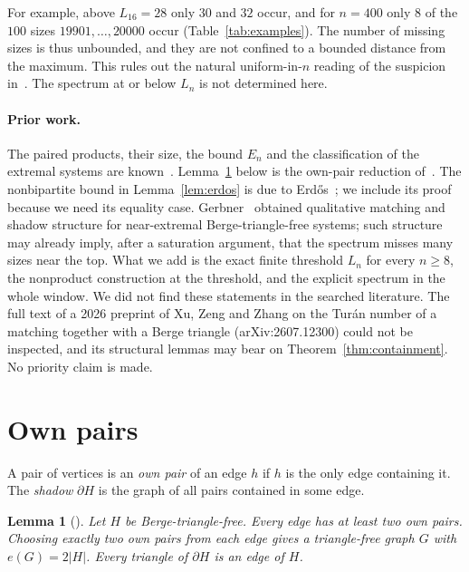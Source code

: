 \documentclass[11pt]{article}
\newtheorem{lemma}[theorem]{Lemma}
\theoremstyle{remark}
\newcommand{\sh}{\partial}
\begin{document}
For example, above $L_{16}=28$ only $30$ and $32$ occur, and for $n=400$
only $8$ of the $100$ sizes $19901,\dots,20000$ occur
(Table~\ref{tab:examples}). The number of missing sizes is thus unbounded,
and they are not confined to a bounded distance from the maximum. This
rules out the natural uniform-in-$n$ reading of the suspicion
in~\cite{BEHJR}. The spectrum at or below $L_n$ is not determined here.

\paragraph{Prior work.} The paired products, their size, the bound $E_n$
and the classification of the extremal systems are
known~\cite{Gyori,FFGHS}. Lemma~\ref{lem:own} below is the own-pair
reduction of~\cite[Observation~2]{FFGHS}. The nonbipartite bound in
Lemma~\ref{lem:erdos} is due to Erd\H{o}s~\cite[Lemma~1]{Erdos}; we include
its proof because we need its equality case. Gerbner~\cite{Gerbner}
obtained qualitative matching and shadow structure for near-extremal
Berge-triangle-free systems; such structure may already imply,
after a saturation argument, that the spectrum misses many sizes near the
top. What we add is the exact finite threshold $L_n$ for every $n\ge8$,
the nonproduct construction at the threshold, and the explicit spectrum in
the whole window. We did not find these statements in the searched
literature. The full text of a 2026 preprint of Xu, Zeng and Zhang on the
Tur\'an number of a matching together with a Berge triangle
(arXiv:2607.12300) could not be inspected, and its structural lemmas may
bear on Theorem~\ref{thm:containment}. No priority claim is made.

\section{Own pairs}

A pair of vertices is an \emph{own pair} of an edge $h$ if $h$ is the only
edge containing it. The \emph{shadow} $\sh H$ is the graph of all pairs
contained in some edge.

\begin{lemma}[{\cite[Observation~2]{FFGHS}}]\label{lem:own}
Let $H$ be Berge-triangle-free. Every edge has at least two own pairs.
Choosing exactly two own pairs from each edge gives a triangle-free graph $G$
with $e(G)=2|H|$. Every triangle of $\sh H$ is an edge of $H$.
\end{lemma}
\end{document}
